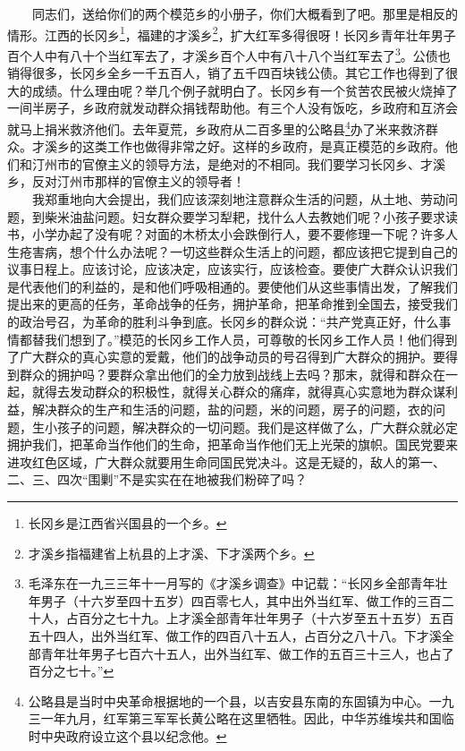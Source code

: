 \documentclass[cn,11pt,chinese]{elegantbook}
\begin{document}
　　同志们，送给你们的两个模范乡的小册子，你们大概看到了吧。那里是相反的情形。江西的长冈乡\footnote[1]{ 长冈乡是江西省兴国县的一个乡。}，福建的才溪乡\footnote[2]{ 才溪乡指福建省上杭县的上才溪、下才溪两个乡。}，扩大红军多得很呀！长冈乡青年壮年男子百个人中有八十个当红军去了，才溪乡百个人中有八十八个当红军去了\footnote[3]{ 毛泽东在一九三三年十一月写的《才溪乡调查》中记载：“长冈乡全部青年壮年男子（十六岁至四十五岁）四百零七人，其中出外当红军、做工作的三百二十人，占百分之七十九。上才溪全部青年壮年男子（十六岁至五十五岁）五百五十四人，出外当红军、做工作的四百八十五人，占百分之八十八。下才溪全部青年壮年男子七百六十五人，出外当红军、做工作的五百三十三人，也占了百分之七十。”}。公债也销得很多，长冈乡全乡一千五百人，销了五千四百块钱公债。其它工作也得到了很大的成绩。什么理由呢？举几个例子就明白了。长冈乡有一个贫苦农民被火烧掉了一间半房子，乡政府就发动群众捐钱帮助他。有三个人没有饭吃，乡政府和互济会就马上捐米救济他们。去年夏荒，乡政府从二百多里的公略县\footnote[4]{ 公略县是当时中央革命根据地的一个县，以吉安县东南的东固镇为中心。一九三一年九月，红军第三军军长黄公略在这里牺牲。因此，中华苏维埃共和国临时中央政府设立这个县以纪念他。}办了米来救济群众。才溪乡的这类工作也做得非常之好。这样的乡政府，是真正模范的乡政府。他们和汀州市的官僚主义的领导方法，是绝对的不相同。我们要学习长冈乡、才溪乡，反对汀州市那样的官僚主义的领导者！\\
　　我郑重地向大会提出，我们应该深刻地注意群众生活的问题，从土地、劳动问题，到柴米油盐问题。妇女群众要学习犁耙，找什么人去教她们呢？小孩子要求读书，小学办起了没有呢？对面的木桥太小会跌倒行人，要不要修理一下呢？许多人生疮害病，想个什么办法呢？一切这些群众生活上的问题，都应该把它提到自己的议事日程上。应该讨论，应该决定，应该实行，应该检查。要使广大群众认识我们是代表他们的利益的，是和他们呼吸相通的。要使他们从这些事情出发，了解我们提出来的更高的任务，革命战争的任务，拥护革命，把革命推到全国去，接受我们的政治号召，为革命的胜利斗争到底。长冈乡的群众说：“共产党真正好，什么事情都替我们想到了。”模范的长冈乡工作人员，可尊敬的长冈乡工作人员！他们得到了广大群众的真心实意的爱戴，他们的战争动员的号召得到广大群众的拥护。要得到群众的拥护吗？要群众拿出他们的全力放到战线上去吗？那末，就得和群众在一起，就得去发动群众的积极性，就得关心群众的痛痒，就得真心实意地为群众谋利益，解决群众的生产和生活的问题，盐的问题，米的问题，房子的问题，衣的问题，生小孩子的问题，解决群众的一切问题。我们是这样做了么，广大群众就必定拥护我们，把革命当作他们的生命，把革命当作他们无上光荣的旗帜。国民党要来进攻红色区域，广大群众就要用生命同国民党决斗。这是无疑的，敌人的第一、二、三、四次“围剿”不是实实在在地被我们粉碎了吗？\\
\end{document}
